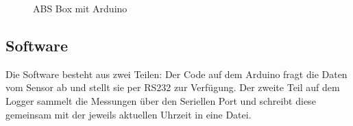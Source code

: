 \documentclass[12pt,a4paper]{scrartcl}
\begin{document}
\begin{figure}[htb]
	\centering
	\caption{ABS Box mit Arduino}
	\label{arduinoboxfigure}
\end{figure}


\subsection{Software} 

Die Software besteht aus zwei Teilen: Der Code auf dem Arduino fragt die Daten vom Sensor ab und stellt sie per RS232 zur Verfügung. Der zweite Teil auf dem Logger sammelt die Messungen über den Seriellen Port und schreibt diese gemeinsam mit der jeweils aktuellen Uhrzeit in eine Datei.\\
\end{document}
